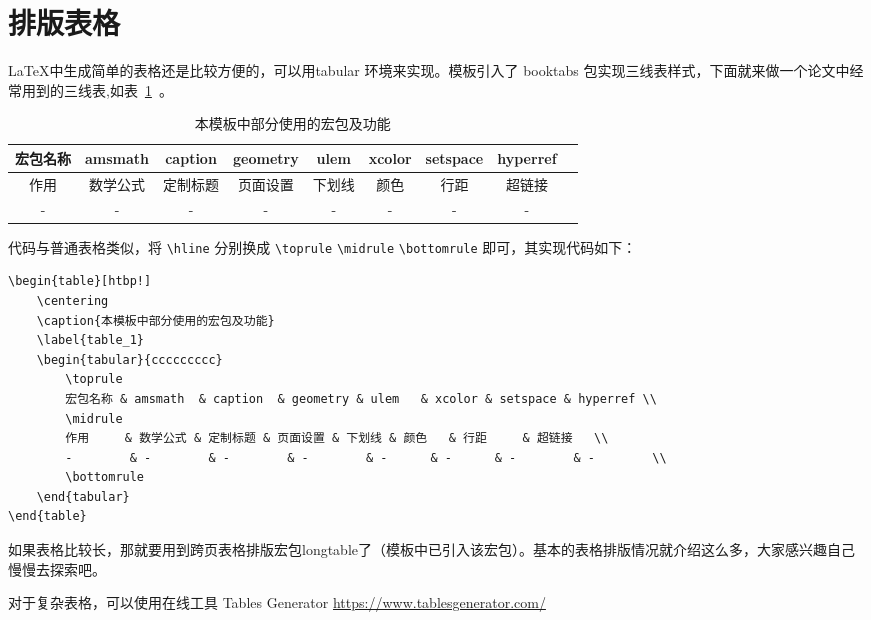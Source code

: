 \section{排版表格}

\LaTeX 中生成简单的表格还是比较方便的，可以用tabular 环境来实现。模板引入了 booktabs 包实现三线表样式，下面就来做一个论文中经常用到的三线表,如表~\ref{table_1}~。

\begin{table}[htbp!]
    \centering
    \caption{本模板中部分使用的宏包及功能}
    \label{table_1}
    \begin{tabular}{ccccccccc}
        \toprule
        宏包名称 & amsmath  & caption  & geometry & ulem   & xcolor & setspace & hyperref \\
        \midrule
        作用     & 数学公式 & 定制标题 & 页面设置 & 下划线 & 颜色   & 行距     & 超链接   \\
        -        & -        & -        & -        & -      & -      & -        & -        \\
        \bottomrule
    \end{tabular}
\end{table}

代码与普通表格类似，将 \verb|\hline| 分别换成 \verb|\toprule| \verb|\midrule| \verb|\bottomrule| 即可，其实现代码如下：

{
\color{green!50!black}
\begin{lstlisting}[breaklines=true,]
\begin{table}[htbp!]
    \centering
    \caption{本模板中部分使用的宏包及功能}
    \label{table_1}
    \begin{tabular}{ccccccccc}
        \toprule
        宏包名称 & amsmath  & caption  & geometry & ulem   & xcolor & setspace & hyperref \\
        \midrule
        作用     & 数学公式 & 定制标题 & 页面设置 & 下划线 & 颜色   & 行距     & 超链接   \\
        -        & -        & -        & -        & -      & -      & -        & -        \\
        \bottomrule
    \end{tabular}
\end{table}
\end{lstlisting}
}

如果表格比较长，那就要用到跨页表格排版宏包longtable了（模板中已引入该宏包）。基本的表格排版情况就介绍这么多，大家感兴趣自己慢慢去探索吧。

对于复杂表格，可以使用在线工具 Tables Generator \url{https://www.tablesgenerator.com/}
